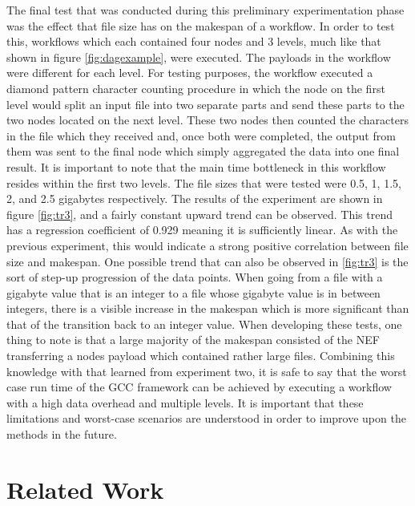 \documentclass[fleqn,10pt]{SelfArx} %
\begin{document}
The final test that was conducted during this preliminary experimentation phase was the effect that file size has on the makespan of a workflow. In order to test this, workflows which each contained four nodes and 3 levels, much like that shown in figure \ref{fig:dagexample}, were executed. The payloads in the workflow were different for each level. For testing purposes, the workflow executed a diamond pattern character counting procedure in which the node on the first level would split an input file into two separate parts and send these parts to the two nodes located on the next level. These two nodes then counted the characters in the file which they received and, once both were completed, the output from them was sent to the final node which simply aggregated the data into one final result. It is important to note that the main time bottleneck in this workflow resides within the first two levels. The file sizes that were tested were 0.5, 1, 1.5, 2, and 2.5 gigabytes respectively. The results of the experiment are shown in figure \ref{fig:tr3}, and a fairly constant upward trend can be observed. This trend has a regression coefficient of 0.929 meaning it is sufficiently linear. As with the previous experiment, this would indicate a strong positive correlation between file size and makespan. One possible trend that can also be observed in \ref{fig:tr3} is the sort of step-up progression of the data points. When going from a file with a gigabyte value that is an integer to a file whose gigabyte value is in between integers, there is a visible increase in the makespan which is more significant than that of the transition back to an integer value. When developing these tests, one thing to note is that a large majority of the makespan consisted of the NEF transferring a nodes payload which contained rather large files. Combining this knowledge with that learned from experiment two, it is safe to say that the worst case run time of the GCC framework can be achieved by executing a workflow with a high data overhead and multiple levels. It is important that these limitations and worst-case scenarios are understood in order to improve upon the methods in the future.


\section{Related Work}
\label{sec:relatedwork}
\end{document}
